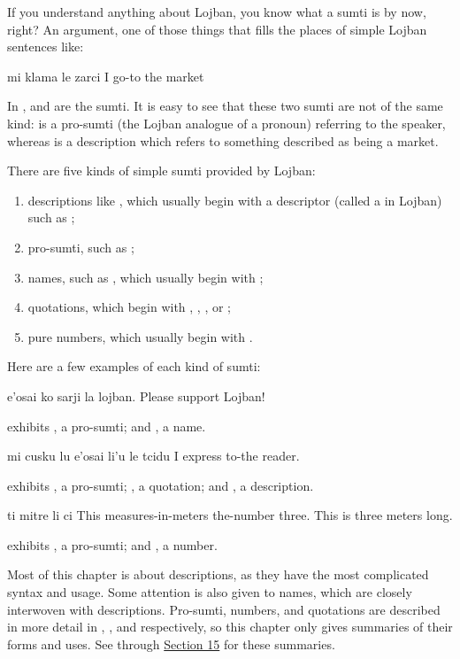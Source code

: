 If you understand anything about Lojban, you know what a
    sumti is by now, right? An argument, one of those things that
    fills the places of simple Lojban sentences like:
\begin{example}
mi klama le zarci\n
I go-to the market
\end{example}

In ,  and  are
    the sumti. It is easy to see that these two sumti are not of
    the same kind:  is a pro-sumti (the Lojban analogue of a
    pronoun) referring to the speaker, whereas  is a
    description which refers to something described as being a
    market. 

There are five kinds of simple sumti provided by Lojban:
\begin{enumerate}
\item descriptions like , which usually begin with a descriptor (called a  in Lojban) such as ;
\item pro-sumti, such as ;
\item names, such as , which usually begin with ;
\item quotations, which begin with , , , or ;
\item pure numbers, which usually begin with .
\end{enumerate}

Here are a few examples of each kind of sumti:
\begin{example}
e'osai ko sarji la lojban.\n
Please support Lojban!
\end{example}

 exhibits , a pro-sumti;
    and , a name.
\begin{example}
mi cusku lu e'osai li'u le tcidu\n
I express  to-the reader.
\end{example}

 exhibits , a pro-sumti;
    , a quotation; and , a
    description.
\begin{example}
ti mitre li ci\n
This measures-in-meters the-number three.\n
This is three meters long.
\end{example}

 exhibits , a pro-sumti;
    and , a number. 

Most of this chapter is about descriptions, as they have the
    most complicated syntax and usage. Some attention is also given
    to names, which are closely interwoven with descriptions.
    Pro-sumti, numbers, and quotations are described in more detail
    in , , and  respectively, so this chapter
    only gives summaries of their forms and uses. See  through \hyperref[sec:6:15]{Section
    15} for these summaries.



